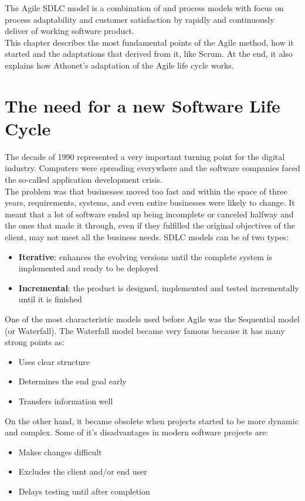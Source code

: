 The Agile SDLC model is a combination of  and  process models with focus on process adaptability and customer satisfaction by rapidly and continuously deliver of working software product\cite{sdlc_agile_model}.\\
This chapter describes the most fundamental points of the Agile method, how it started and the adaptations that derived from it, like Scrum.
At the end, it also explains how Athonet's adaptation of the Agile life cycle works.

\section{The need for a new Software Life Cycle}
	The decade of 1990 represented a very important turning point for the digital industry.
	Computers were spreading everywhere and the software companies faced the so-called application development crisis.\\
	The problem was that businesses moved too fast and within the space of three years, requirements, systems, and even entire businesses were likely to change. 
	It meant that a lot of software ended up being incomplete or canceled halfway and the ones that made it through, even if they fulfilled the original objectives of the client, may not meet all the business needs\cite{agility-beyond-history}.
	SDLC models can be of two types:
	\begin{itemize}
		\item \textbf{Iterative}: enhances the evolving versions until the complete system is implemented and ready to be deployed
		\item \textbf{Incremental}: the product is designed, implemented and tested incrementally until it is finished
	\end{itemize}
	One of the most characteristic models used before Agile was the Sequential model (or Waterfall).
	The Waterfall model became very famous because it has many strong points as:
	\begin{itemize}
		\item Uses clear structure
		\item Determines the end goal early
		\item Transfers information well
	\end{itemize}
	On the other hand, it became obsolete when projects started to be more dynamic and complex.
	Some of it's disadvantages in modern software projects are:
	\begin{itemize}
		\item Makes changes difficult
		\item Excludes the client and/or end user
		\item Delays testing until after completion
	\end{itemize}
